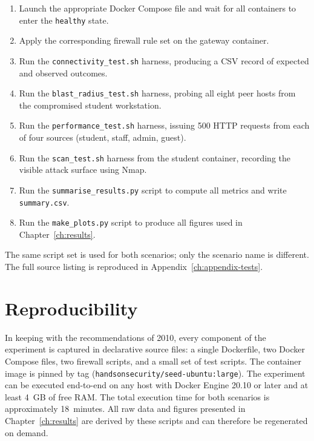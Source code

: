 \begin{enumerate}[label=\arabic*., leftmargin=*]
    \item Launch the appropriate Docker Compose file and wait for all containers to enter the \texttt{healthy} state.
    \item Apply the corresponding firewall rule set on the gateway container.
    \item Run the \texttt{connectivity\_test.sh} harness, producing a CSV record of expected and observed outcomes.
    \item Run the \texttt{blast\_radius\_test.sh} harness, probing all eight peer hosts from the compromised student workstation.
    \item Run the \texttt{performance\_test.sh} harness, issuing 500 HTTP requests from each of four sources (student, staff, admin, guest).
    \item Run the \texttt{scan\_test.sh} harness from the student container, recording the visible attack surface using Nmap.
    \item Run the \texttt{summarise\_results.py} script to compute all metrics and write \texttt{summary.csv}.
    \item Run the \texttt{make\_plots.py} script to produce all figures used in Chapter~\ref{ch:results}.
\end{enumerate}

The same script set is used for both scenarios; only the scenario name is different. The full source listing is reproduced in Appendix~\ref{ch:appendix-tests}.

\section{Reproducibility}

In keeping with the recommendations of \textcite{Sommer and Paxson}{2010}, every component of the experiment is captured in declarative source files: a single Dockerfile, two Docker Compose files, two firewall scripts, and a small set of test scripts. The container image is pinned by tag (\texttt{handsonsecurity/seed-ubuntu:large}). The experiment can be executed end-to-end on any host with Docker Engine 20.10 or later and at least 4~GB of free RAM. The total execution time for both scenarios is approximately 18~minutes. All raw data and figures presented in Chapter~\ref{ch:results} are derived by these scripts and can therefore be regenerated on demand.
